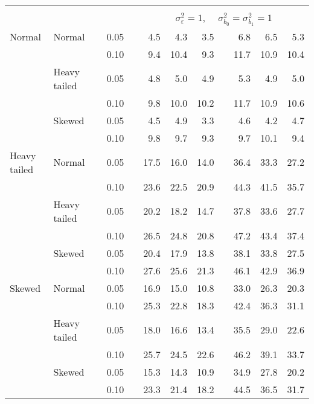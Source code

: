 \begin{table}[ht]
\begin{scriptsize}
\begin{center}
\begin{tabular}{ll p{.1cm} c p{.1cm} rrr p{.1cm} rrr}
&&&&&&&&&&&\\
& && && \multicolumn{7}{c}{$\sigma_{\varepsilon}^2 = 1$, \ \ $\sigma_{b_0}^2 = \sigma_{b_1}^2 = 1$} \\ \cline{6-12}
Normal       & Normal       && 0.05 &&   4.5 & 4.3 & 3.5 &   & 6.8 & 6.5 & 5.3 \\ 
             &              && 0.10 &&   9.4 & 10.4 & 9.3 &   & 11.7 & 10.9 & 10.4 \\ 
             & Heavy tailed && 0.05 &&   4.8 & 5.0 & 4.9 &   & 5.3 & 4.9 & 5.0 \\ 
             &              && 0.10 &&   9.8 & 10.0 & 10.2 &   & 11.7 & 10.9 & 10.6 \\ 
             & Skewed       && 0.05 &&   4.5 & 4.9 & 3.3 &   & 4.6 & 4.2 & 4.7 \\ 
             &              && 0.10 &&   9.8 & 9.7 & 9.3 &   & 9.7 & 10.1 & 9.4 \\ 
Heavy tailed & Normal       && 0.05 &&   17.5 & 16.0 & 14.0 &   & 36.4 & 33.3 & 27.2 \\ 
             &              && 0.10 &&   23.6 & 22.5 & 20.9 &   & 44.3 & 41.5 & 35.7 \\ 
             & Heavy tailed && 0.05 &&   20.2 & 18.2 & 14.7 &   & 37.8 & 33.6 & 27.7 \\ 
             &              && 0.10 &&   26.5 & 24.8 & 20.8 &   & 47.2 & 43.4 & 37.4 \\ 
             & Skewed       && 0.05 &&   20.4 & 17.9 & 13.8 &   & 38.1 & 33.8 & 27.5 \\ 
             &              && 0.10 &&   27.6 & 25.6 & 21.3 &   & 46.1 & 42.9 & 36.9 \\ 
Skewed       & Normal       && 0.05 &&   16.9 & 15.0 & 10.8 &   & 33.0 & 26.3 & 20.3 \\ 
             &              && 0.10 &&   25.3 & 22.8 & 18.3 &   & 42.4 & 36.3 & 31.1 \\ 
             & Heavy tailed && 0.05 &&   18.0 & 16.6 & 13.4 &   & 35.5 & 29.0 & 22.6 \\ 
             &              && 0.10 &&   25.7 & 24.5 & 22.6 &   & 46.2 & 39.1 & 33.7 \\ 
             & Skewed       && 0.05 &&   15.3 & 14.3 & 10.9 &   & 34.9 & 27.8 & 20.2 \\ 
             &              && 0.10 &&   23.3 & 21.4 & 18.2 &   & 44.5 & 36.5 & 31.7 \\ 


\end{tabular}
\end{center}
\end{scriptsize}
\end{table}
